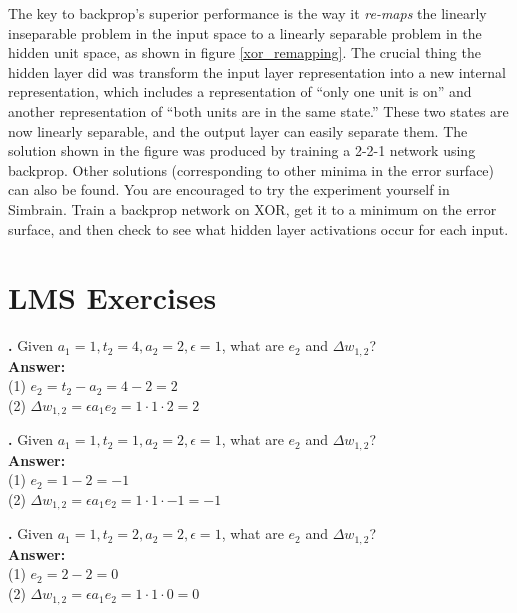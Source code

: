 The key to backprop's superior performance is the way it \emph{re-maps} the linearly inseparable problem in the input space to a linearly separable problem in the hidden unit space, as shown in figure \ref{xor_remapping}. The crucial thing the hidden layer did was transform the input layer representation into a new internal representation, which includes a representation of ``only one unit is on'' and another representation of ``both units are in the same state.''  These two states are now linearly separable, and the output layer can easily separate them. The solution shown in the figure was produced by training a 2-2-1 network using backprop. Other solutions (corresponding to other minima in the error surface) can also be found. You are encouraged to try the experiment yourself in Simbrain. Train a backprop network on XOR, get it to a minimum on the error surface, and then check to see what hidden layer activations occur for each input.

\section{LMS Exercises}




\noindent
{}
{\bf \theLMSCounter.}  Given $a_1 = 1, t_2 = 4, a_2 = 2, \epsilon = 1$, what are $e_2$ and $\Delta w_{1,2}$? \\
{\bf Answer:}  \\
(1) $e_2 = t_2 - a_2 = 4 - 2  = 2 $ \\
(2) $\Delta w_{1,2} = \epsilon a_1 e_2 = 1 \cdot 1 \cdot  2 = 2$
\bigskip

\noindent
{}
{\bf \theLMSCounter.}  Given $a_1 = 1, t_2 = 1, a_2 = 2, \epsilon = 1$, what are $e_2$ and $\Delta w_{1,2}$? \\
{\bf Answer:}  \\
(1) $e_2 = 1 - 2  = -1 $ \\
(2) $\Delta w_{1,2} = \epsilon a_1 e_2 = 1 \cdot 1 \cdot  -1 = -1$
\bigskip

\noindent
{}
{\bf \theLMSCounter.}  Given $a_1 = 1, t_2 = 2, a_2 = 2, \epsilon = 1$, what are $e_2$ and $\Delta w_{1,2}$? \\
{\bf Answer:}  \\
(1) $e_2 = 2 - 2  = 0 $ \\
(2) $\Delta w_{1,2} = \epsilon a_1 e_2 = 1 \cdot 1 \cdot 0 = 0$
\bigskip

